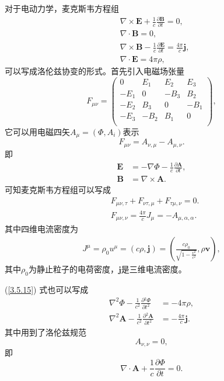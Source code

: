 \documentclass[11pt, a4paper, oneside, onecolumn]{ctexart}
\numberwithin{equation}{subsection}
\begin{document}
对于电动力学，麦克斯韦方程组
\begin{align}
&\nabla\times\boldsymbol{E}+\frac{1}{c}\frac{\partial{}\boldsymbol{B}}{\partial{}t}=0,\\
&\nabla\cdot\boldsymbol{B}=0,\\
&\nabla\times\boldsymbol{B}-\frac{1}{c}\frac{\partial{}\boldsymbol{E}}{\partial{}t}=\frac{4\pi}{c}\boldsymbol{j},\\
&\nabla\cdot\boldsymbol{E}=4\pi\rho,
\end{align}
可以写成洛伦兹协变的形式。首先引入电磁场张量
\begin{equation}
F_{\mu\nu}=\begin{pmatrix}
0 & E_{1} & E_{2} & E_{3}\\
-E_{1} & 0 & -B_{3} & B_{2}\\
-E_{2} & B_{3} & 0 & -B_{1}\\
-E_{3} & -B_{2} & B_{1} & 0\\
\end{pmatrix},
\end{equation}
它可以用电磁四矢$A_{\mu}=\left(\Phi,A_{i}\right)$表示
\begin{equation}
F_{\mu\nu}=A_{\nu,\mu}-A_{\mu,\nu}.
\end{equation}
即
\begin{align}
\boldsymbol{E}&=-\nabla\Phi-\frac{1}{c}\frac{\partial{}\boldsymbol{A}}{\partial{}t},\\
\boldsymbol{B}&=\nabla\times\boldsymbol{A}.
\end{align}
可知麦克斯韦方程组可以写成
\begin{align}
&F_{\mu\nu,\tau}+F_{\nu\tau,\mu}+F_{\tau\mu,\nu}=0.\\
&F_{\mu\nu,\nu}=\frac{4\pi}{c}J_{\mu}=-A_{\mu,\alpha,\alpha}.\label{3.5.15}
\end{align}
其中四维电流密度为
\begin{align}
J^{\mu}=\rho_{0}u^{\mu}=\left(c\rho,\boldsymbol{j}\right)=\left(\frac{c\rho_{0}}{\sqrt{1-\frac{v^{2}}{c^{2}}}},\rho\boldsymbol{v}\right),
\end{align}
其中$\rho_{0}$为静止粒子的电荷密度，$\boldsymbol{j}$是三维电流密度。

(\ref{3.5.15}) 式也可以写成
\begin{align}
\nabla^{2}\Phi-\frac{1}{c^{2}}\frac{\partial{}^{2}\Phi}{\partial{}t^{2}}&=-4\pi\rho,\\
\nabla^{2}\boldsymbol{A}-\frac{1}{c^{2}}\frac{\partial{}^{2}\boldsymbol{A}}{\partial{}t^{2}}&=-\frac{4\pi}{c}\boldsymbol{j}.
\end{align}
其中用到了洛伦兹规范
\begin{equation}
A_{\nu,\nu}=0,
\end{equation}
即
\begin{equation}
\nabla\cdot\boldsymbol{A}+\frac{1}{c}\frac{\partial{}\Phi}{\partial{}t}=0.
\end{equation}
\end{document}

